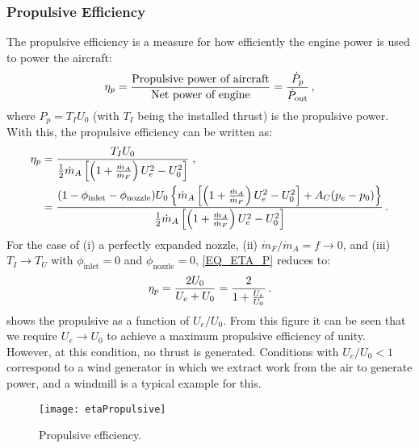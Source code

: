 \subsubsection{Propulsive Efficiency}
The propulsive efficiency is a measure for how efficiently the engine power is used to power the aircraft:
\begin{equation}
  \label{EQ_ETA_P}
  \eta_p = {\frac{\text{Propulsive power of aircraft}}{\text{Net power of engine}}} = {\frac{\dot{P}_p}{\dot{P}_\text{out}}}\,,
\end{equation}
where $P_p = T_I U_0$ (with $T_I$ being the installed thrust) is the propulsive power. With this, the propulsive efficiency can be written as:
\begin{equation}
  \begin{split}
    \eta_p &= {\frac{T_IU_0}{{\frac{1}{2}}\dot{m}_A\left[ \left( 1+{\frac{\dot{m}_A}{\dot{m}_F}}\right)U_e^2-U_0^2\right]}}\;,\\
               &= {\frac{(1-\phi_\text{inlet}-\phi_\text{nozzle})U_0\left\{\dot{m}_A\left[ \left( 1+{\frac{\dot{m}_A}{\dot{m}_F}}\right)U_e^2-U_0^2\right] + A_C (p_e-p_0) \right\}}{{\frac{1}{2}}\dot{m}_A\left[ \left( 1+{\frac{\dot{m}_A}{\dot{m}_F}}\right)U_e^2-U_0^2\right]}}\,.
  \end{split}
\end{equation}
For the case of (i) a perfectly expanded nozzle, (ii) $\dot{m}_F/\dot{m}_A=f \rightarrow 0$, and (iii) $T_I \rightarrow T_U$ with $\phi_\text{inlet} = 0$ and $\phi_\text{nozzle} = 0$, \cref{EQ_ETA_P} reduces to:
\begin{equation}
\label{eqn:etaPropulsive}
  \eta_p = {\frac{2U_0}{U_e+U_0}} = {\frac{2}{1+{\frac{U_e}{U_0}}}}\,.
\end{equation}
 shows the propulsive as a function of $U_e / U_0$. From this figure it can be seen that we require $U_e\to U_0$ to achieve a maximum propulsive efficiency of unity. However, at this condition, no thrust is generated. Conditions with $U_e/U_0<1$ correspond to a wind generator in which we extract work from the air to generate power, and a windmill is a typical example for this.

\begin{figure}[!htb!]
  \begin{center}
    \texttt{[image: etaPropulsive]}
    \caption{\label{fig:ETA_PROPULSIVE}Propulsive efficiency.}
  \end{center}
\end{figure}

